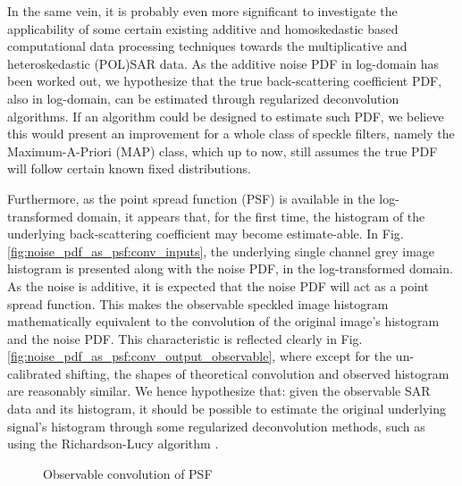 In
                the same vein, it is probably even more significant to
                investigate the applicability of some certain existing
                additive and homoskedastic based computational data
                processing techniques towards the multiplicative and
                heteroskedastic (POL)SAR data.
As the additive noise PDF in log-domain has been worked out, we hypothesize that the true back-scattering coefficient PDF, also in log-domain, can be estimated through regularized deconvolution algorithms.
If an algorithm could be designed to estimate such PDF, we believe this would present an improvement for a whole class of speckle filters, namely the Maximum-A-Priori (MAP) class, which up to now, still assumes the true PDF will follow certain known fixed distributions.

Furthermore, as the point spread function (PSF) is available in the log-transformed domain, it appears that, for the first time, the histogram of the underlying back-scattering coefficient may become estimate-able. 
In Fig. 
	\ref{fig:noise_pdf_as_psf:conv_inputs}, 
the underlying single channel grey image histogram is presented along with the noise PDF, in the log-transformed domain. 
As the noise is additive, it is expected that the noise PDF will act as a point spread function.
This makes the observable speckled image histogram mathematically equivalent to the convolution of the original image's histogram and the noise PDF.
This characteristic is reflected clearly in Fig. 
	\ref{fig:noise_pdf_as_psf:conv_output_observable}, 
where except for the un-calibrated shifting, the shapes of theoretical convolution and observed histogram are reasonably similar.
We hence hypothesize that: given the observable SAR data and its histogram, it should be possible to estimate the original underlying signal's histogram through some regularized deconvolution methods,
  such as using the Richardson-Lucy algorithm \cite{Richardson_1972_JOptSocAm, Lucy_1974_JAstronomical}.

\begin{figure}[h!]
\centering
	\hfill
\caption{Observable convolution of PSF}
\label{fig:noise_pdf_as_psf}
\end{figure}
  
